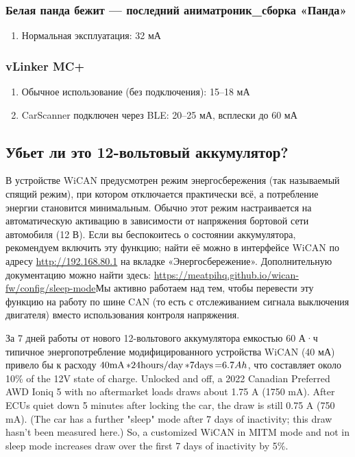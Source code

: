 \documentclass[superscriptaddress,onecolumn,floatfix]{revtex4-2}
\begin{document}
\subsubsection{Белая панда бежит — последний аниматроник\_сборка «Панда»}
\begin{enumerate}
  \item{Нормальная эксплуатация:} 32 мА
\end{enumerate}

\subsubsection{vLinker MC+}
\begin{enumerate}
  \item{Обычное использование (без подключения):} 15–18 мА
  \item{CarScanner подключен через BLE:} 20–25 мА, всплески до 60 мА
\end{enumerate}

\subsection{Убьет ли это 12-вольтовый аккумулятор?}

В устройстве WiCAN предусмотрен режим энергосбережения (так называемый спящий режим), при котором отключается практически всё, а потребление энергии становится минимальным. Обычно этот режим настраивается на автоматическую активацию в зависимости от напряжения бортовой сети автомобиля (12 В). Если вы беспокоитесь о состоянии аккумулятора, рекомендуем включить эту функцию; найти её можно в интерфейсе WiCAN по адресу \href{http://192.168.80.1}{http://192.168.80.1} на вкладке «Энергосбережение». Дополнительную документацию можно найти здесь: \href{https://meatpihq.github.io/wican-fw/config/sleep-mode}{https://meatpihq.github.io/wican-fw/config/sleep-mode}Мы активно работаем над тем, чтобы перевести эту функцию на работу по шине CAN (то есть с отслеживанием сигнала выключения двигателя) вместо использования контроля напряжения. 

За 7 дней работы от нового 12-вольтового аккумулятора емкостью 60 А·ч типичное энергопотребление модифицированного устройства WiCAN (40 мА) привело бы к расходу $40 \unit[\mathrm{mA}] * 24 \unit[\mathrm{hours/day}] * 7 \unit[\mathrm{days}] = 6.7 Ah$, что составляет около 10\% of the 12V state of charge. Unlocked and off, a 2022 Canadian Preferred AWD Ioniq 5 with no aftermarket loads draws about 1.75 A (1750 mA). After ECUs quiet down 5 minutes after locking the car, the draw is still 0.75 A (750 mA). (The car has a further "sleep" mode after 7 days of inactivity; this draw hasn't been measured here.) So, a customized WiCAN in MITM mode and not in sleep mode increases draw over the first 7 days of inactivity by 5\%.
\end{document}
